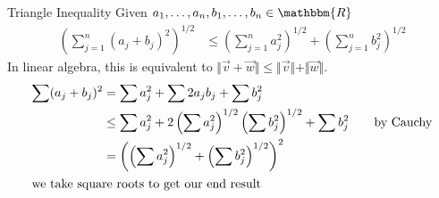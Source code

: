 \documentclass[10pt]{extarticle}
\newcommand{\R}{\mathbbm{R}}
\begin{document}
  \begin{problem}{Triangle Inequality}
    Given $a_1,\dots,a_n,b_1,\dots,b_n\in\R$
    \begin{align*}
      \left(\sum_{j=1}^{n}(a_j + b_j)^2\right)^{1/2} &\leq \left(\sum_{j=1}^{n}a_j^2\right)^{1/2} + \left(\sum_{j=1}^{n}b_j^2\right)^{1/2}
    \end{align*}
    In linear algebra, this is equivalent to $\Vert\vec{v} + \vec{w}\Vert \leq \Vert\vec{v}\Vert + \Vert\vec{w}\Vert$.
    \tcblower
    \begin{align*}
      \sum (a_j + b_j)^2 &= \sum a_j^2 + \sum 2a_jb_j + \sum b_j^2\\
                         &\leq \sum a_j^2 + 2\left(\sum a_j^2\right)^{1/2}\left(\sum b_j^2\right)^{1/2} + \sum b_j^2\tag*{by Cauchy}\\
                         &= \left(\left(\sum a_j^2\right)^{1/2} + \left(\sum b_j^2\right)^{1/2} \right)^2\\
                         \shortintertext{we take square roots to get our end result}
    \end{align*}
  \end{problem}
\end{document}
